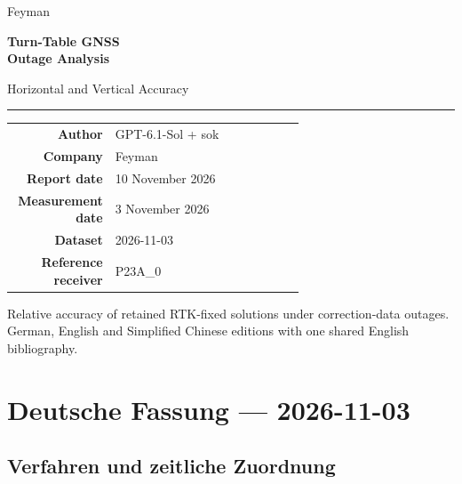 \documentclass[11pt,a4paper]{article}
\numberwithin{equation}{section}
\numberwithin{figure}{section}
\begin{document}
\hypersetup{pageanchor=false}
\begin{titlepage}
\centering
\vspace*{15mm}
{\Large\sffamily\color{reportblue} Feyman\par}
\vspace{22mm}
{\Huge\bfseries\color{reportblue} Turn-Table GNSS\\[5mm]Outage Analysis\par}
\vspace{8mm}
{\Large Horizontal and Vertical Accuracy\par}
\vspace{12mm}
{\color{reportblue}\rule{0.8\linewidth}{1pt}\par}
\vspace{12mm}
\begin{tabular}{rp{0.65\linewidth}}
\textbf{Author} & GPT-6.1-Sol + sok\\[7pt]
\textbf{Company} & Feyman\\[7pt]
\textbf{Report date} & 10 November 2026\\[7pt]
\textbf{Measurement date} & 3 November 2026\\[7pt]
\textbf{Dataset} & 2026-11-03\\[7pt]
\textbf{Reference receiver} & P23A\_0\\[7pt]
\end{tabular}
\vfill
\begin{minipage}{0.87\linewidth}\centering\small
Relative accuracy of retained RTK-fixed solutions under correction-data outages.
German, English and Simplified Chinese editions with one shared English bibliography.
\end{minipage}
\vspace{15mm}
\end{titlepage}
\hypersetup{pageanchor=true}
\setcounter{tocdepth}{2}
\makeatletter
\renewcommand*\l@subsection{\@dottedtocline{2}{1.5em}{3.2em}}
\makeatother
\renewcommand{\contentsname}{Contents / Inhaltsverzeichnis / {\cjkfont 目录}}
{\small\tableofcontents}
\clearpage
{}
\clearpage\section{Deutsche Fassung — 2026-11-03}

\subsection{Verfahren und zeitliche Zuordnung}
\end{document}
